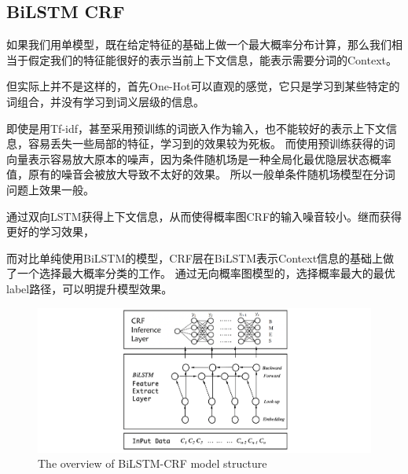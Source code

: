 \subsection*{BiLSTM CRF}

如果我们用单模型，既在给定特征的基础上做一个最大概率分布计算，那么我们相当于假定我们的特征能很好的表示当前上下文信息，能表示需要分词的Context。

但实际上并不是这样的，首先One-Hot可以直观的感觉，它只是学习到某些特定的词组合，并没有学习到词义层级的信息。

即使是用Tf-idf，甚至采用预训练的词嵌入作为输入，也不能较好的表示上下文信息，容易丢失一些局部的特征，学习到的效果较为死板。
而使用预训练获得的词向量表示容易放大原本的噪声，因为条件随机场是一种全局化最优隐层状态概率值，原有的噪音会被放大导致不太好的效果。
所以一般单条件随机场模型在分词问题上效果一般。

通过双向LSTM获得上下文信息，从而使得概率图CRF的输入噪音较小。继而获得更好的学习效果，

而对比单纯使用BiLSTM的模型，CRF层在BiLSTM表示Context信息的基础上做了一个选择最大概率分类的工作。
通过无向概率图模型的，选择概率最大的最优label路径，可以明提升模型效果。


\begin{figure}[htbp!]
    \begin{center}
    \includegraphics[width=1\textwidth]{figures/model.pdf}
    \end{center}
    \caption{The overview of BiLSTM-CRF model structure}
    \label{fig:overall_model}
\end{figure}